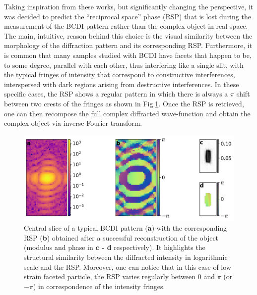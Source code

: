 Taking inspiration from these works, but 
significantly changing the perspective, it was decided to predict the ``reciprocal space'' phase (RSP) that is 
lost during the measurement of the BCDI pattern rather than the complex object in real space.
The main, intuitive, reason behind this choice is the visual 
similarity between the morphology of the diffraction pattern and its corresponding RSP. 
Furthermore, it is common that many samples studied with BCDI have facets that happen to be, to some degree, parallel with each other, 
thus interfering like a single slit, with the typical fringes of intensity that correspond to constructive interferences, 
interspersed with dark regions arising from destructive interferences. In these specific cases, the RSP shows a regular 
pattern in which there is always a $\pi$ shift between two crests of the fringes as shown in Fig.\ref{fig:rec_space_phase}.
Once the RSP is retrieved, one can then recompose the full complex diffracted wave-function and obtain the complex object via 
inverse Fourier transform.\\

\begin{figure}[H]
    \centering
    \includegraphics[width=.8\textwidth]{figures/Phasing/rec_space_phase.pdf}
    \caption{Central slice of a typical BCDI pattern (\textbf{a}) with the corresponding RSP (\textbf{b}) obtained after a 
    successful reconstruction of the object (modulus and phase in \textbf{c - d} respectively). It highlights the structural 
    similarity between the diffracted intensity 
    in logarithmic scale and the RSP. Moreover, one can notice that in this case of low strain faceted particle, 
     the RSP varies regularly between 0 and $\pi$ (or $-\pi$) in correspondence of the intensity fringes. }
    \label{fig:rec_space_phase}
\end{figure}

